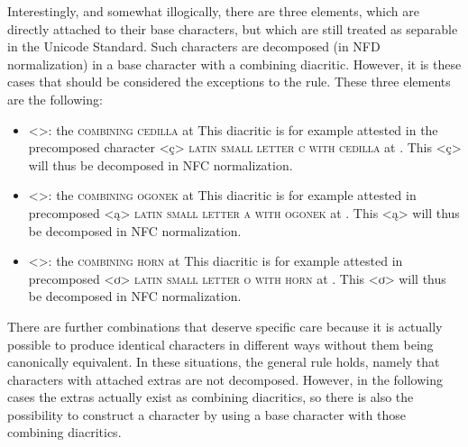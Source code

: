 Interestingly, and somewhat illogically, there are three elements, which are
directly attached to their base characters, but which are still treated as
separable in the Unicode Standard. Such characters are decomposed (in NFD
normalization) in a base character with a combining diacritic. However, it is
these cases that should be considered the exceptions to the rule. These three 
elements are the following:

\begin{itemize}

  \item <>: the \textsc{combining cedilla} at  \newline 
        This diacritic is
        for example attested in the precomposed character <ç> \textsc{latin
        small letter c with cedilla} at . This <ç> will thus be
        decomposed in NFC normalization.
  \item <>: the \textsc{combining ogonek} at  \newline 
        This diacritic is
        for example attested in precomposed <ą> \textsc{latin small letter a
        with ogonek} at . This <ą> will thus be decomposed in NFC
        normalization.
  \item <>: the \textsc{combining horn} at  \newline 
        This diacritic is for
        example attested in precomposed <ơ> \textsc{latin small letter o with
        horn} at . This <ơ> will thus be decomposed in NFC
        normalization. 

\end{itemize}

There are further combinations that deserve specific care because it is actually
possible to produce identical characters in different ways without them being
canonically equivalent. In these situations, the general rule holds, namely that
characters with attached extras are not decomposed. However, in the following
cases the extras actually exist as combining diacritics, so there is also 
the possibility to construct a character by using a base character with those 
combining diacritics.


